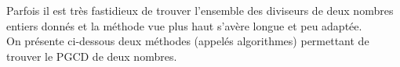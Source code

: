 
Parfois il est très fastidieux de trouver l'ensemble des diviseurs de deux nombres entiers donnés et la méthode vue plus haut s'avère longue et peu adaptée. \\
On présente ci-dessous deux méthodes (appelés algorithmes) permettant de trouver le PGCD de deux nombres.